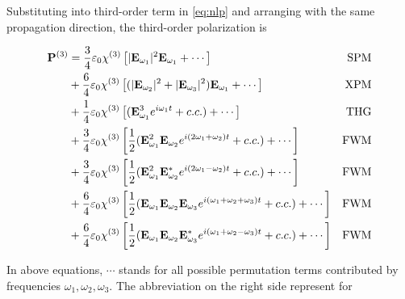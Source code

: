 Substituting into third-order term in \autoref{eq:nlp} and arranging with the same propagation direction, the third-order polarization is 

\begin{align}
  \vb{P}^{(3)} 
  & = \frac{3}{4} \varepsilon_0 \chi^{(3)} \left[| \vb{E}_{\omega_1} |^2 \vb{E}_{\omega_1} + \cdots\right] & \mathrm{SPM} \\
  & + \frac{6}{4} \varepsilon_0 \chi^{(3)} \left[(| \vb{E}_{\omega_2} |^2 + |\vb{E}_{\omega_3} |^2) \vb{E}_{\omega_1} + \cdots \right] & \mathrm{XPM} \\
  & + \frac{1}{4} \varepsilon_0 \chi^{(3)} \left[(\vb{E}_{\omega_1}^3 e^{i \omega_1 t} + c.c.) + \cdots\right] & \mathrm{THG} \\
  & + \frac{3}{4} \varepsilon_0 \chi^{(3)} \left[ \frac{1}{2} (\vb{E}_{\omega_1}^2 \vb{E}_{\omega_2} e^{i (2 \omega_1 + \omega_2) t} + c.c.) + \cdots \right] & \mathrm{FWM} \label{eq:fwm1} \\ 
  & + \frac{3}{4} \varepsilon_0 \chi^{(3)} \left[ \frac{1}{2} (\vb{E}_{\omega_1}^2 \vb{E}^{\ast}_{\omega_2} e^{i (2 \omega_1 - \omega_2) t} + c.c.) + \cdots \right] & \mathrm{FWM} \label{eq:fwm2} \\ 
  & + \frac{6}{4} \varepsilon_0 \chi^{(3)} \left[ \frac{1}{2} (\vb{E}_{\omega_1} \vb{E}_{\omega_2} \vb{E}_{\omega_3} e^{i (\omega_1 + \omega_2 + \omega_3) t} + c.c.) + \cdots \right] & \mathrm{FWM}  \label{eq:fwm3} \\
  & + \frac{6}{4} \varepsilon_0 \chi^{(3)} \left[ \frac{1}{2} (\vb{E}_{\omega_1} \vb{E}_{\omega_2} \vb{E}^{\ast}_{\omega_3} e^{i (\omega_1 + \omega_2 - \omega_3) t} + c.c.) + \cdots \right] & \mathrm{FWM} \label{eq:fwm4}
\end{align}

In above equations, $\cdots$ stands for all possible permutation terms contributed by frequencies $\omega_1, \omega_2, \omega_3$. The abbreviation on the right side represent for 

